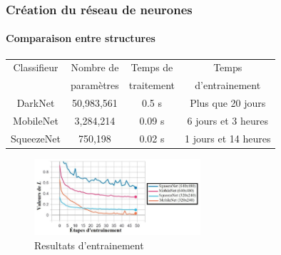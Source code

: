 
\begin{frame}
\frametitle{Création du réseau de neurones}
\framesubtitle{Comparaison entre structures}

\begin{table}
\begin{tabular}{c|c|c|c}
    Classifieur  &  Nombre de   &  Temps de    &  Temps          \\
                 &  paramètres  &  traitement  &  d'entrainement \\
    \hline
    DarkNet      &  50,983,561  &  0.5  s      &  Plus que 20 jours \\
    MobileNet    &  3,284,214   &  0.09 s      &  6 jours et 3 heures  \\
    SqueezeNet   &  750,198     &  0.02 s      &  1 jours et 14 heures
\end{tabular}
\end{table}
\centering
\begin{figure}
    \includegraphics[width=0.55\textwidth]{figures/Epochs.PNG}\caption{Resultats d'entrainement}
\end{figure}
\end{frame}


